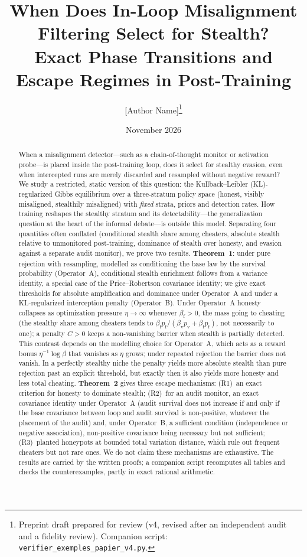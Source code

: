\documentclass[11pt,a4paper]{article}
\title{When Does In-Loop Misalignment Filtering Select for Stealth?\\
Exact Phase Transitions and Escape Regimes in Post-Training}
\author{[Author Name]\thanks{Preprint draft prepared for review (v4, revised after an independent audit and a fidelity review). Companion script: \texttt{verifier\_exemples\_papier\_v4.py}.}}
\date{November 2026}
\begin{document}
\maketitle

\begin{abstract}
When a misalignment detector---such as a chain-of-thought monitor or activation probe---is placed inside the post-training loop, does it select for stealthy evasion, even when intercepted runs are merely discarded and resampled without negative reward? We study a restricted, static version of this question: the Kullback--Leibler (KL)-regularized Gibbs equilibrium over a three-stratum policy space (honest, visibly misaligned, stealthily misaligned) with \emph{fixed} strata, priors and detection rates. How training reshapes the stealthy stratum and its detectability---the generalization question at the heart of the informal debate---is outside this model. Separating four quantities often conflated (conditional stealth share among cheaters, absolute stealth relative to unmonitored post-training, dominance of stealth over honesty, and evasion against a separate audit monitor), we prove two results. \textbf{Theorem~1}: under pure rejection with resampling, modelled as conditioning the base law by the survival probability (Operator~A), conditional stealth enrichment follows from a variance identity, a special case of the Price--Robertson covariance identity; we give exact thresholds for absolute amplification and dominance under Operator~A and under a KL-regularized interception penalty (Operator~B). Under Operator~A honesty collapses as optimization pressure $\eta \to \infty$ whenever $\beta_{\mathrm{f}} > 0$, the mass going to cheating (the stealthy share among cheaters tends to $\beta_{\mathrm{f}}p_{\mathrm{f}}/(\beta_{\mathrm{v}}p_{\mathrm{v}}+\beta_{\mathrm{f}}p_{\mathrm{f}})$, not necessarily to one); a penalty $C>0$ keeps a non-vanishing barrier when stealth is partially detected. This contrast depends on the modelling choice for Operator~A, which acts as a reward bonus $\eta^{-1}\log\beta$ that vanishes as $\eta$ grows; under repeated rejection the barrier does not vanish. In a perfectly stealthy niche the penalty yields more absolute stealth than pure rejection past an explicit threshold, but exactly then it also yields more honesty and less total cheating. \textbf{Theorem~2} gives three escape mechanisms: (R1)~an exact criterion for honesty to dominate stealth; (R2)~for an audit monitor, an exact covariance identity under Operator~A (audit survival does not increase if and only if the base covariance between loop and audit survival is non-positive, whatever the placement of the audit) and, under Operator~B, a sufficient condition (independence or negative association), non-positive covariance being necessary but not sufficient; (R3)~planted honeypots at bounded total variation distance, which rule out frequent cheaters but not rare ones. We do not claim these mechanisms are exhaustive. The results are carried by the written proofs; a companion script recomputes all tables and checks the counterexamples, partly in exact rational arithmetic.
\end{abstract}
\end{document}
